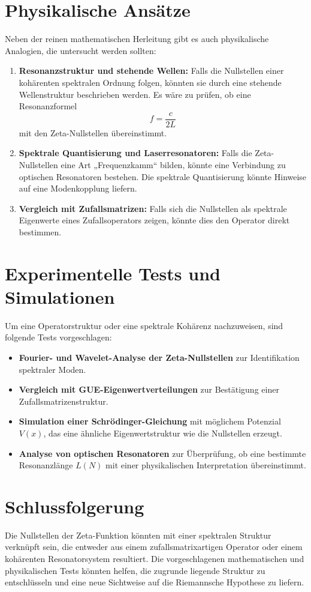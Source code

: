 \documentclass[a4paper,12pt]{article}
\begin{document}
\section{Physikalische Ansätze}
Neben der reinen mathematischen Herleitung gibt es auch physikalische Analogien, die untersucht werden sollten:
\begin{enumerate}
    \item \textbf{Resonanzstruktur und stehende Wellen:} Falls die Nullstellen einer kohärenten spektralen Ordnung folgen, könnten sie durch eine stehende Wellenstruktur beschrieben werden. Es wäre zu prüfen, ob eine Resonanzformel
    \[
    f = \frac{c}{2L}
    \]
    mit den Zeta-Nullstellen übereinstimmt.
    \item \textbf{Spektrale Quantisierung und Laserresonatoren:} Falls die Zeta-Nullstellen eine Art „Frequenzkamm“ bilden, könnte eine Verbindung zu optischen Resonatoren bestehen. Die spektrale Quantisierung könnte Hinweise auf eine Modenkopplung liefern.
    \item \textbf{Vergleich mit Zufallsmatrizen:} Falls sich die Nullstellen als spektrale Eigenwerte eines Zufallsoperators zeigen, könnte dies den Operator direkt bestimmen.
\end{enumerate}

\section{Experimentelle Tests und Simulationen}
Um eine Operatorstruktur oder eine spektrale Kohärenz nachzuweisen, sind folgende Tests vorgeschlagen:
\begin{itemize}
    \item \textbf{Fourier- und Wavelet-Analyse der Zeta-Nullstellen} zur Identifikation spektraler Moden.
    \item \textbf{Vergleich mit GUE-Eigenwertverteilungen} zur Bestätigung einer Zufallsmatrizenstruktur.
    \item \textbf{Simulation einer Schrödinger-Gleichung} mit möglichem Potenzial \(V(x)\), das eine ähnliche Eigenwertstruktur wie die Nullstellen erzeugt.
    \item \textbf{Analyse von optischen Resonatoren} zur Überprüfung, ob eine bestimmte Resonanzlänge \(L(N)\) mit einer physikalischen Interpretation übereinstimmt.
\end{itemize}

\section{Schlussfolgerung}
Die Nullstellen der Zeta-Funktion könnten mit einer spektralen Struktur verknüpft sein, die entweder aus einem zufallsmatrixartigen Operator oder einem kohärenten Resonatorsystem resultiert. Die vorgeschlagenen mathematischen und physikalischen Tests könnten helfen, die zugrunde liegende Struktur zu entschlüsseln und eine neue Sichtweise auf die Riemannsche Hypothese zu liefern.
\end{document}
